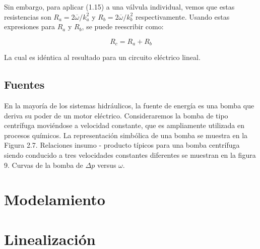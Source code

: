 \documentclass[a4paper,12pt,twoside]{proyectotanquesecci}
\begin{document}
Sin embargo, para aplicar (1.15) a una válvula individual, vemos que estas resistencias son $R_{a}=2\overline{\omega}/k^{2}_{a}$ y $R_{b}=2\overline{\omega}/k^{2}_{b}$ respectivamente. Usando estas expresiones para $R_{a}$ y $R_{b}$, se puede reescribir como:

\begin{equation}
R_{c}=R_{a}+R_{b}
\end{equation}

La cual es idéntica al resultado para un circuito eléctrico lineal.

\subsection{Fuentes}

En la mayoría de los sistemas hidráulicos, la fuente de energía es una bomba que deriva su poder de un motor eléctrico. Consideraremos la bomba de tipo centrífuga moviéndose a velocidad constante, que es ampliamente utilizada en procesos químicos. La representación simbólica de una bomba se muestra en la Figura 2.7. Relaciones insumo - producto típicos para una bomba centrífuga siendo conducido a tres velocidades constantes diferentes se muestran en la figura 9. Curvas de la bomba de $\Delta p$ versus $\omega$.\\

\newpage





\section{Modelamiento}




\newpage




\section{Linealización}
\end{document}
